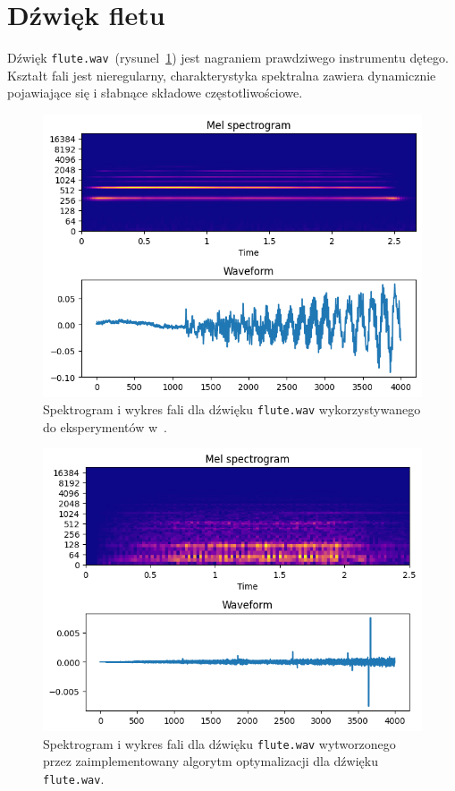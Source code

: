 \newpage

\section{Dźwięk fletu}

Dźwięk \texttt{flute.wav}~(rysunel~\ref{fig:literature_flute_sound_overview})
jest nagraniem prawdziwego instrumentu dętego. Kształt fali jest nieregularny,
charakterystyka spektralna zawiera dynamicznie pojawiające się i słabnące 
składowe częstotliwościowe.

\begin{figure}[H]
    \centering
    \includegraphics[width=0.7\linewidth]{rys06/target_sample_flute_literature.png}
    \caption{
      Spektrogram i wykres fali dla dźwięku \texttt{flute.wav} wykorzystywanego
      do eksperymentów w~\cite{evolutionary_puredata_results}.
    }\label{fig:literature_flute_sound_overview}
\end{figure}

\begin{figure}[H]
    \centering
    \includegraphics[width=0.7\linewidth]{rys06/evolved_sample_flute.png}
    \caption{
      Spektrogram i wykres fali dla dźwięku \texttt{flute.wav}
      wytworzonego przez zaimplementowany algorytm optymalizacji
      dla dźwięku \texttt{flute.wav}.
    }\label{fig:evolved_flute_sound_overview}
\end{figure}


